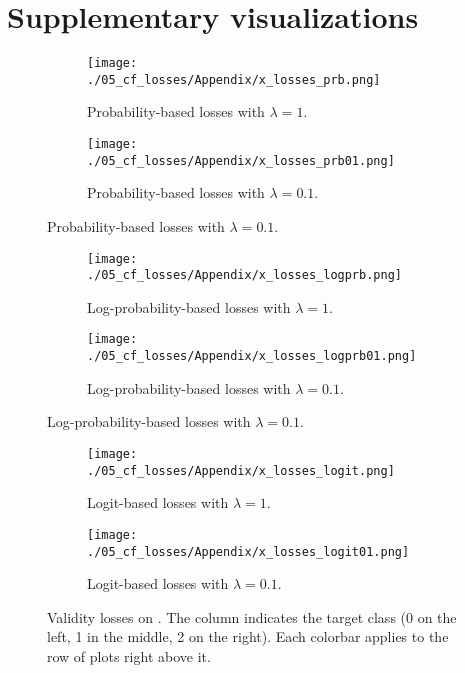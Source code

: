 \documentclass[../main.tex]{subfiles}
\begin{document}
\chapter{Supplementary visualizations}
\label{ch:plots}

\begin{figure}
    \centering

    \begin{subfigure}[b]{\textwidth}
        \centering
        \texttt{[image: ./05\_cf\_losses/Appendix/x\_losses\_prb.png]}
        \caption{Probability-based losses with $\lambda=1$.}
    \end{subfigure}
    \begin{subfigure}[b]{\textwidth}
        \centering
        \texttt{[image: ./05\_cf\_losses/Appendix/x\_losses\_prb01.png]}
        \caption{Probability-based losses with $\lambda=0.1$.}
    \end{subfigure}
\end{figure}
\begin{figure}\ContinuedFloat
    \centering
    \begin{subfigure}[b]{\textwidth}
        \centering
        \texttt{[image: ./05\_cf\_losses/Appendix/x\_losses\_logprb.png]}
        \caption{Log-probability-based losses with $\lambda=1$.}
    \end{subfigure}
    \begin{subfigure}[b]{\textwidth}
        \centering
        \texttt{[image: ./05\_cf\_losses/Appendix/x\_losses\_logprb01.png]}
        \caption{Log-probability-based losses with $\lambda=0.1$.}
    \end{subfigure}
\end{figure}
\begin{figure}\ContinuedFloat
    \begin{subfigure}[b]{\textwidth}
        \centering
        \texttt{[image: ./05\_cf\_losses/Appendix/x\_losses\_logit.png]}
        \caption{Logit-based losses with $\lambda=1$.}
    \end{subfigure}
    \begin{subfigure}[b]{\textwidth}
        \centering
        \texttt{[image: ./05\_cf\_losses/Appendix/x\_losses\_logit01.png]}
        \caption{Logit-based losses with $\lambda=0.1$.}
    \end{subfigure}

    \caption{Validity losses on \CakeOnSea. The column indicates the target class (0 on the left, 1 in the middle, 2 on the right). Each colorbar applies to the row of plots right above it.}
\end{figure}
\end{document}
